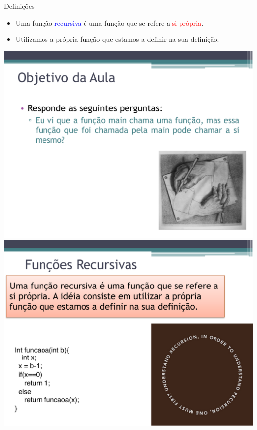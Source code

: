 \documentclass{beamer}
\newcommand{\blue}[1]{\textcolor{blue}{#1}}
\newcommand{\red}[1]{\textcolor{red}{#1}}
\begin{document}
\begin{frame}[fragile]{Definições}
\begin{block}{}
\begin{itemize}
 \item Uma função \blue{recursiva} é uma função que se refere a \red{si própria}. 
 \item Utilizamos a própria função que estamos a definir na sua definição.
 \end{itemize}
\end{block}

\includegraphics[scale=0.5]{img/escher}
\qquad
\includegraphics[scale=0.4]{img/rec}
\end{frame}
\end{document}

